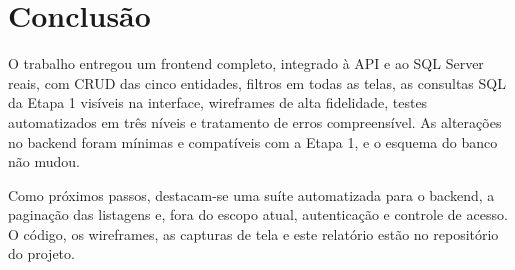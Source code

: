 \documentclass[12pt]{article}
\begin{document}
\section{Conclusão}

O trabalho entregou um frontend completo, integrado à API e ao SQL Server reais, com CRUD das cinco entidades, filtros em todas as telas, as consultas SQL da Etapa 1 visíveis na interface, wireframes de alta fidelidade, testes automatizados em três níveis e tratamento de erros compreensível. As alterações no backend foram mínimas e compatíveis com a Etapa 1, e o esquema do banco não mudou.

Como próximos passos, destacam-se uma suíte automatizada para o backend, a paginação das listagens e, fora do escopo atual, autenticação e controle de acesso. O código, os wireframes, as capturas de tela e este relatório estão no repositório do projeto.



\end{document}
